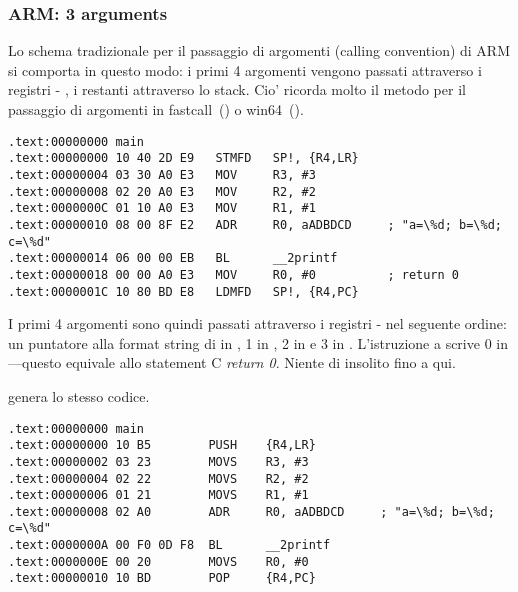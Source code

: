 \subsubsection{ARM: 3 arguments}

Lo schema tradizionale per il passaggio di argomenti (calling convention) di ARM si comporta in questo modo:
i primi 4 argomenti vengono passati attraverso i registri - , i restanti attraverso lo stack.
Cio' ricorda molto il metodo per il passaggio di argomenti in 
fastcall~() o win64~().


\mysubparagraph{\NonOptimizingKeilVI (\ARMMode)}

\begin{lstlisting}[caption=\NonOptimizingKeilVI (\ARMMode),style=customasmARM]
.text:00000000 main
.text:00000000 10 40 2D E9   STMFD   SP!, {R4,LR}
.text:00000004 03 30 A0 E3   MOV     R3, #3
.text:00000008 02 20 A0 E3   MOV     R2, #2
.text:0000000C 01 10 A0 E3   MOV     R1, #1
.text:00000010 08 00 8F E2   ADR     R0, aADBDCD     ; "a=\%d; b=\%d; c=\%d"
.text:00000014 06 00 00 EB   BL      __2printf
.text:00000018 00 00 A0 E3   MOV     R0, #0          ; return 0
.text:0000001C 10 80 BD E8   LDMFD   SP!, {R4,PC}
\end{lstlisting}

I primi 4 argomenti sono quindi passati attraverso i registri - nel seguente ordine:
un puntatore alla format string di \printf in 
, 1 in , 2 in  e 3 in .
L'istruzione a  scrive 0 in ---questo equivale allo statement C \emph{return 0}.
Niente di insolito fino a qui.

\OptimizingKeilVI genera lo stesso codice.

\mysubparagraph{\OptimizingKeilVI (\ThumbMode)}

\begin{lstlisting}[caption=\OptimizingKeilVI (\ThumbMode),style=customasmARM]
.text:00000000 main
.text:00000000 10 B5        PUSH    {R4,LR}
.text:00000002 03 23        MOVS    R3, #3
.text:00000004 02 22        MOVS    R2, #2
.text:00000006 01 21        MOVS    R1, #1
.text:00000008 02 A0        ADR     R0, aADBDCD     ; "a=\%d; b=\%d; c=\%d"
.text:0000000A 00 F0 0D F8  BL      __2printf
.text:0000000E 00 20        MOVS    R0, #0
.text:00000010 10 BD        POP     {R4,PC}
\end{lstlisting}


